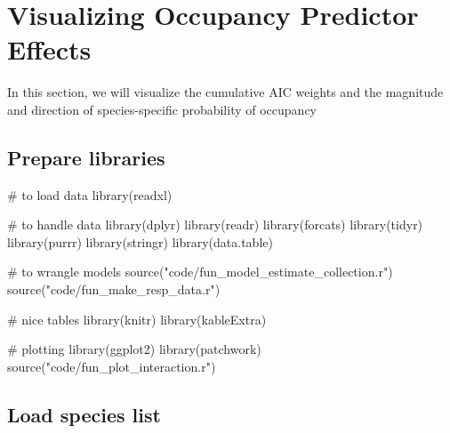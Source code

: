 \documentclass[]{article}
\newenvironment{Shaded}{}{}
\newcommand{\CommentTok}[1]{\textcolor[rgb]{0.00,0.50,0.00}{#1}}
\newcommand{\KeywordTok}[1]{\textcolor[rgb]{0.00,0.00,1.00}{#1}}
\newcommand{\NormalTok}[1]{#1}
\newcommand{\OperatorTok}[1]{#1}
\newcommand{\StringTok}[1]{\textcolor[rgb]{0.00,0.50,0.50}{#1}}
\begin{document}
\hypertarget{visualizing-occupancy-predictor-effects}{%
\section{Visualizing Occupancy Predictor Effects}\label{visualizing-occupancy-predictor-effects}}

In this section, we will visualize the cumulative AIC weights and the magnitude and direction of species-specific probability of occupancy

\hypertarget{prepare-libraries-3}{%
\subsection{Prepare libraries}\label{prepare-libraries-3}}

\begin{Shaded}
\begin{Highlighting}[]
\CommentTok{# to load data}
\KeywordTok{library}\NormalTok{(readxl)}

\CommentTok{# to handle data}
\KeywordTok{library}\NormalTok{(dplyr)}
\KeywordTok{library}\NormalTok{(readr)}
\KeywordTok{library}\NormalTok{(forcats)}
\KeywordTok{library}\NormalTok{(tidyr)}
\KeywordTok{library}\NormalTok{(purrr)}
\KeywordTok{library}\NormalTok{(stringr)}
\KeywordTok{library}\NormalTok{(data.table)}

\CommentTok{# to wrangle models}
\KeywordTok{source}\NormalTok{(}\StringTok{"code/fun_model_estimate_collection.r"}\NormalTok{)}
\KeywordTok{source}\NormalTok{(}\StringTok{"code/fun_make_resp_data.r"}\NormalTok{)}

\CommentTok{# nice tables}
\KeywordTok{library}\NormalTok{(knitr)}
\KeywordTok{library}\NormalTok{(kableExtra)}

\CommentTok{# plotting}
\KeywordTok{library}\NormalTok{(ggplot2)}
\KeywordTok{library}\NormalTok{(patchwork)}
\KeywordTok{source}\NormalTok{(}\StringTok{"code/fun_plot_interaction.r"}\NormalTok{)}
\end{Highlighting}
\end{Shaded}

\hypertarget{load-species-list}{%
\subsection{Load species list}\label{load-species-list}}

\begin{Shaded}
\end{Shaded}
\end{document}
